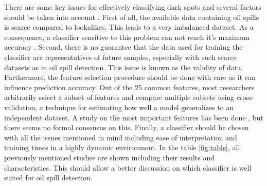 There are some key issues for effectively classifying dark spots and several factors should be taken into account \cite{Kubat:1998:MLD:288808.288812}. First of all, the available data containing oil spills is scarce compared to lookalikes. This leads to a very imbalanced dataset. As a consequence, a classifier sensitive to this problem can not reach it's maximum accuracy \cite{Japkowicz20026}. Second, there is no guarantee that the data used for training the classifier are representatives of future samples, especially with such scarce datasets as in oil spill detection. This issue is known as the validity of data. Furthermore, the feature selection procedure should be done with care as it can influence prediction accuracy. Out of the 25 common features, most researchers arbitrarily select a subset of features and compare multiple subsets using cross-validation, a technique for estimating how well a model generalizes to an independent dataset. A study on the most important features has been done \cite{topouzelis2003oil}, but there seems no formal consensus on this. Finally, a classifier should be chosen with all the issues mentioned in mind including ease of interpretation and training times in a highly dynamic environment. In the table \ref{fig:table}, all previously mentioned studies are shown including their results and characteristics. This should allow a better discussion on which classifier is well suited for oil spill detection.

